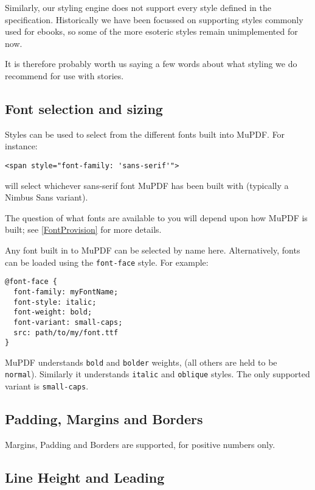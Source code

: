 \documentclass[oneside]{book}
\newcommand{\rjwref}[1] {\autoref{#1} \nameref{#1}}
\begin{document}
Similarly, our styling engine does not support every style defined in the specification. Historically we have been focussed on supporting styles commonly used for ebooks, so some of the more esoteric styles remain unimplemented for now.

It is therefore probably worth us saying a few words about what styling we do recommend for use with stories.

\subsection{Font selection and sizing}

Styles can be used to select from the different fonts built into MuPDF. For instance:

\begin{lstlisting}
<span style="font-family: 'sans-serif'">
\end{lstlisting}

will select whichever sans-serif font MuPDF has been built with (typically a Nimbus Sans variant).

The question of what fonts are available to you will depend upon how MuPDF is built; see \rjwref{FontProvision} for more details.

Any font built in to MuPDF can be selected by name here. Alternatively, fonts can be loaded using the \texttt{font-face} style. For example:

\begin{lstlisting}
@font-face {
  font-family: myFontName;
  font-style: italic;
  font-weight: bold;
  font-variant: small-caps;
  src: path/to/my/font.ttf
}
\end{lstlisting}

MuPDF understands \texttt{bold} and \texttt{bolder} weights, (all others are held to be \texttt{normal}). Similarly it understands \texttt{italic} and \texttt{oblique} styles. The only supported variant is \texttt{small-caps}.

\subsection{Padding, Margins and Borders}

Margins, Padding and Borders are supported, for positive numbers only.

\subsection{Line Height and Leading}
\end{document}
